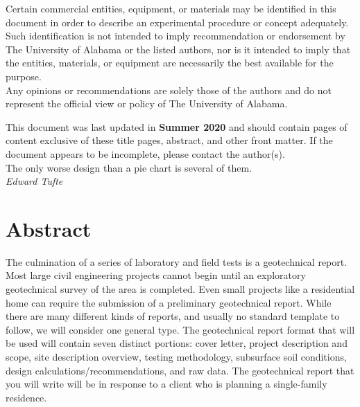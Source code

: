 \documentclass[12pt]{article}
\newcommand{\LastUpdate}{Summer 2020}
\begin{document}
\begin{titlepage}
\begin{center}
\normalsize 
Certain commercial entities, equipment, or materials may be identified in this document in order to describe an experimental procedure or concept adequately. Such identification is not intended to imply recommendation or endorsement by The University of Alabama or the listed authors, nor is it intended to imply that the entities, materials, or equipment are necessarily the best available for the purpose.\\

\vfill
Any opinions or recommendations are solely those of the authors and do not represent the official view or policy of The University of Alabama.
\end{center}
\begin{flushright}
\vfill
\normalsize 
This document was last updated in \textbf{\LastUpdate} and should contain \textbf{\pageref{LastPage}} pages of content exclusive of these title pages, abstract, and other front matter. If the document appears to be incomplete, please contact the author(s).\\
\vfill
The only worse design than a pie chart is several of them.\\
\textit{Edward Tufte}
\end{flushright}
\end{titlepage}
\section*{Abstract}
\normalsize The culmination of a series of laboratory and field tests is a geotechnical report. Most large civil engineering projects cannot begin until an exploratory geotechnical survey of the area is completed. Even small projects like a residential home can require the submission of a preliminary geotechnical report. While there are many different kinds of reports, and usually no standard template to follow, we will consider one general type. The geotechnical report format that will be used will contain seven distinct portions: cover letter, project description and scope, site description overview, testing methodology, subsurface soil conditions, design calculations/recommendations, and raw data. The geotechnical report that you will write will be in response to a client who is planning a single-family residence.\\
\end{document}
